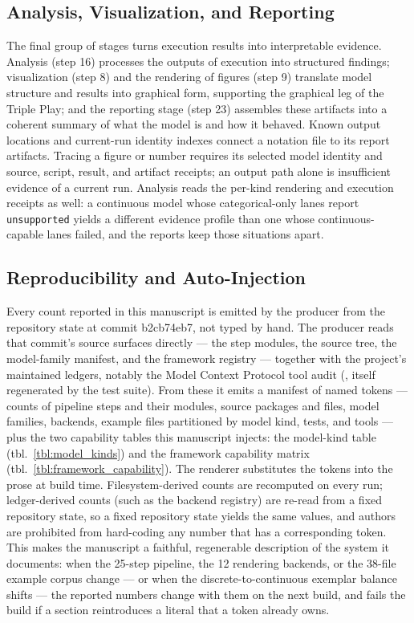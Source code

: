 \documentclass[
  english,
  9pt,
]{extarticle}
\begin{document}
\subsection{Analysis, Visualization, and
Reporting}\label{analysis-visualization-and-reporting}

The final group of stages turns execution results into interpretable
evidence. Analysis (step 16) processes the outputs of execution into
structured findings; visualization (step 8) and the rendering of figures
(step 9) translate model structure and results into graphical form,
supporting the graphical leg of the Triple Play; and the reporting stage
(step 23) assembles these artifacts into a coherent summary of what the
model is and how it behaved. Known output locations and current-run
identity indexes connect a notation file to its report artifacts.
Tracing a figure or number requires its selected model identity and
source, script, result, and artifact receipts; an output path alone is
insufficient evidence of a current run. Analysis reads the per-kind
rendering and execution receipts as well: a continuous model whose
categorical-only lanes report \texttt{unsupported} yields a different
evidence profile than one whose continuous-capable lanes failed, and the
reports keep those situations apart.

\subsection{Reproducibility and
Auto-Injection}\label{reproducibility-and-auto-injection}

Every count reported in this manuscript is emitted by the producer
 from the
repository state at commit b2cb74eb7, not typed by hand. The producer
reads that commit's source surfaces directly --- the step modules, the
source tree, the model-family manifest, and the framework registry ---
together with the project's maintained ledgers, notably the Model
Context Protocol tool audit (,
itself regenerated by the test suite). From these it emits a manifest of
named tokens --- counts of pipeline steps and their modules, source
packages and files, model families, backends, example files partitioned
by model kind, tests, and tools --- plus the two capability tables this
manuscript injects: the model-kind table (tbl.~\ref{tbl:model_kinds})
and the framework capability matrix
(tbl.~\ref{tbl:framework_capability}). The renderer substitutes the
tokens into the prose at build time. Filesystem-derived counts are
recomputed on every run; ledger-derived counts (such as the backend
registry) are re-read from a fixed repository state, so a fixed
repository state yields the same values, and authors are prohibited from
hard-coding any number that has a corresponding token. This makes the
manuscript a faithful, regenerable description of the system it
documents: when the 25-step pipeline, the 12 rendering backends, or the
38-file example corpus change --- or when the discrete-to-continuous
exemplar balance shifts --- the reported numbers change with them on the
next build, and  fails the
build if a section reintroduces a literal that a token already owns.
\end{document}
